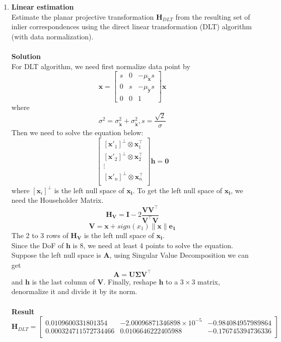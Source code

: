 \documentclass{../../assignment}
\begin{document}
\begin{problemlist}
\begin{enumerate}
\item \textbf{Linear estimation}\\
Estimate the planar projective transformation $\mathbf{H}_{DLT}$ from the resulting set of inlier correspondences using the direct linear transformation (DLT) algorithm (with data normalization).
\\\\
\textbf{Solution}\\
For DLT algorithm, we need first normalize data point by
$$
\mathbf{x}=
\begin{bmatrix}
s & 0 & -\mu_{\tilde{\mathbf{x}}}s\\
0 & s & -\mu_{\tilde{\mathbf{y}}}s\\
0 & 0 & 1
\end{bmatrix}\mathbf{x}
$$
where
$$
\sigma^2 = \sigma_{\tilde{\mathbf{x}}}^2 + \sigma_{\tilde{\mathbf{x}}}^2,
s = \frac{\sqrt{2}}{\sigma}
$$
Then we need to solve the equation below:
\[
\begin{bmatrix}
[\mathbf{x}'_1]^{\bot} \otimes \mathbf{x}_1^{\top}\\
[\mathbf{x}'_2]^{\bot} \otimes \mathbf{x}_2^{\top}\\
\vdots \\
[\mathbf{x}'_n]^{\bot} \otimes \mathbf{x}_n^{\top}\\
\end{bmatrix}\mathbf{h}=\mathbf{0}
\]
where $[\mathbf{x}_i]^{\bot}$ is the left null space of $\mathbf{x_i}$.
To get the left null space of $\mathbf{x_i}$, we need the Householder Matrix.
$$\mathbf{H_V} = \mathbf{I} - 2\frac{\mathbf{V V^{\top}}}{\mathbf{V^{\top} V}}$$
$$\mathbf{V} = \mathbf{x} + sign(x_1)\|\mathbf{x}\|\mathbf{e_1}$$
The 2 to 3 rows of $\mathbf{H_V}$ is the left null space of $\mathbf{x_i}$.\\
Since the DoF of $\mathbf{h}$ is 8, we need at least 4 points to solve the equation. Suppose the left null space is $\mathbf{A}$, using Singular Value Decomposition we can get
$$\mathbf{A} = \mathbf{U}\mathbf{\Sigma}\mathbf{V}^{\top}$$
and $\mathbf{h}$ is the last column of $\mathbf{V}$. Finally, reshape $\mathbf{h}$ to a $3\times 3$ matrix, denormalize it and divide it by its norm.
\\\\
\textbf{Result}\\
\[
\mathbf{H}_{DLT} = 
\begin{bmatrix}
0.0109600331801354  &  -2.00096871346898\times 10^{-5} & -0.984084957989864\\
0.000324711572734466 & 0.0106646222405988 & -0.176745394736336\\

\end{bmatrix}\]
\end{enumerate}
\end{problemlist}
\end{document}
